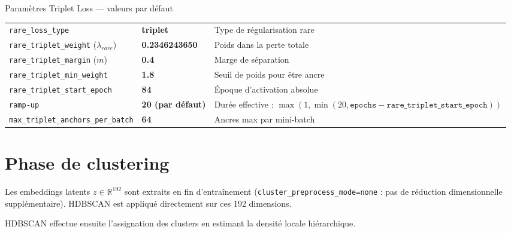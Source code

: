 \documentclass[11pt,a4paper]{article}
\begin{document}
\begin{parambox}{Param\`etres Triplet Loss --- valeurs par d\'efaut}
\begin{tabular}{lll}
\texttt{rare\_loss\_type} & \textbf{triplet} & Type de r\'egularisation rare \\
\texttt{rare\_triplet\_weight} ($\lambda_{rare}$) & \textbf{0.2346243650} & Poids dans la perte totale \\
\texttt{rare\_triplet\_margin} ($m$) & \textbf{0.4} & Marge de s\'eparation \\
\texttt{rare\_triplet\_min\_weight} & \textbf{1.8} & Seuil de poids pour \^etre ancre \\
\texttt{rare\_triplet\_start\_epoch} & \textbf{84} & \'Epoque d'activation absolue \\
\texttt{ramp-up} & \textbf{20 (par d\'efaut)} & Dur\'ee effective : $\max(1,\min(20,\texttt{epochs} - \texttt{rare\_triplet\_start\_epoch}))$ \\
\texttt{max\_triplet\_anchors\_per\_batch} & \textbf{64} & Ancres max par mini-batch \\
\end{tabular}
\end{parambox}

\section{Phase de clustering}
\label{sec:clustering}

Les embeddings latents $z \in \mathbb{R}^{192}$ sont extraits en fin d'entra\^inement (\texttt{cluster\_preprocess\_mode=none} : pas de r\'eduction dimensionnelle suppl\'ementaire). HDBSCAN est appliqu\'e directement sur ces 192 dimensions.

HDBSCAN effectue ensuite l'assignation des clusters en estimant la densit\'e locale hi\'erarchique.
\end{document}
